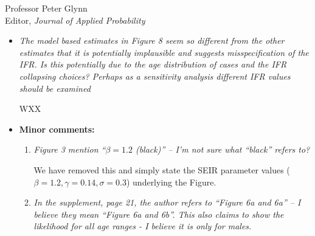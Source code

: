 \documentclass[11pt]{letter} %
\begin{document}
\begin{letter}{Professor
	Peter Glynn\\
	Editor, {\em Journal of Applied Probability}}
\begin{itemize}
\vspace{5mm}
WXX
\vspace{5mm}
\item {\it The model based estimates in Figure 8 seem so different from the other estimates that it is potentially implausible and suggests misspecification of the IFR. Is this potentially due to the age distribution of cases and the IFR collapsing choices? Perhaps as a sensitivity analysis different IFR values should be examined}

\vspace{5mm}
WXX
\vspace{5mm}
\item {\bf Minor comments:}
	\begin{enumerate}
		\item {\it Figure 3 mention “$\beta = 1.2$ (black)” – I’m not sure what “black” refers to?}
		\vspace{5mm}

		We have removed this and simply state the SEIR parameter values ($\beta = 1.2, \gamma = 0.14, \sigma = 0.3$) underlying the Figure.

		\item {\it In the supplement, page 21, the author refers to “Figure 6a and 6a” – I believe they mean “Figure 6a and 6b”. This also claims to show the likelihood for all age ranges - I believe it is only for males.}
	\end{enumerate}
\end{itemize}

\end{letter}
\end{document}
